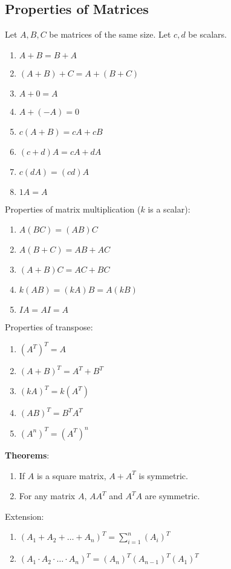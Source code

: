 \documentclass{math}
\begin{document}
\subsection*{Properties of Matrices}
Let \( A,B,C \) be matrices of the same size. Let \( c,d \) be scalars.
\begin{enumerate}
  \item \( A+B = B+A \)
  \item \( (A+B)+C = A+(B+C) \)
  \item \( A+0 = A \)
  \item \( A+(-A) = 0 \)
  \item \( c(A+B) = cA+cB \)
  \item \( (c+d)A = cA+dA \)
  \item \( c(dA) = (cd)A \)
  \item \( 1A = A \)
\end{enumerate}
Properties of matrix multiplication (\( k \) is a scalar):
\begin{enumerate}
  \item \( A(BC) = (AB)C \)
  \item \( A(B+C) = AB+AC \)
  \item \( (A+B)C = AC+BC \)
  \item \( k(AB) = (kA)B = A(kB) \)
  \item \( IA = AI = A \)
\end{enumerate}
Properties of transpose:
\begin{enumerate}
  \item \( (A^T)^T = A \)
  \item \( (A+B)^T = A^T+B^T \)
  \item \( (kA)^T = k(A^T) \)
  \item \( (AB)^T = B^TA^T \)
  \item \( (A^n)^T = (A^T)^n \)
\end{enumerate}
\textbf{Theorems}:
\begin{enumerate}
  \item If \( A \) is a square matrix, \( A+A^T \) is symmetric.
  \item For any matrix \( A \), \( AA^T \) and \( A^TA \) are symmetric.
\end{enumerate}
Extension:
\begin{enumerate}
  \item \( (A_1+A_2+\dots+A_n)^T = \sum_{i=1}^{n}(A_i)^T \)
  \item \( (A_1\cdot A_2\cdot\dots\cdot A_n)^T = (A_n)^T(A_{n-1})^T(A_1)^T \)
\end{enumerate}
\end{document}

